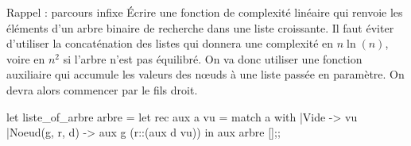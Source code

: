 \begin{exo}{Rappel : parcours infixe}{}
Écrire une fonction de complexité linéaire qui renvoie  les éléments d'un arbre binaire de recherche dans une liste croissante.
\reponse
Il faut éviter d'utiliser la concaténation des listes qui donnera une complexité en $n\ln(n)$, voire en $n^2$ si l'arbre n'est pas équilibré. On va donc utiliser une fonction auxiliaire qui accumule les valeurs des nœuds à une liste passée en paramètre. On devra alors commencer par le fils droit.
\begin{ocaml}
let liste_of_arbre arbre =
  let rec aux a vu =
      match a with
      |Vide -> vu
      |Noeud(g, r, d) -> aux g (r::(aux d vu))
  in aux arbre [];;
\end{ocaml}
\end{exo}

